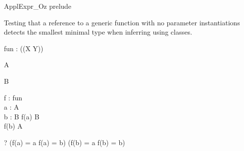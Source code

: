 \begin{zsection}
 \SECTION ApplExpr\_Oz \parents prelude
\end{zsection}

Testing that a reference to a generic function with no parameter
instantiations detects the smallest minimal type when inferring using
classes.

\begin{gendef}[X, Y]
 fun : \power (\power(X \cross Y))
\end{gendef}

\begin{class}{A}
\end{class}

\begin{class}{B}
\end{class}

\begin{axdef}
 f : fun\\
 a : A\\
 b : B
\where
 f(a) \in B\\
 f(b) \in A\\
\end{axdef}

\begin{zed}
 \vdash? (f(a) = a \lor f(a) = b) \land
         (f(b) = a \lor f(b) = b)
\end{zed}
